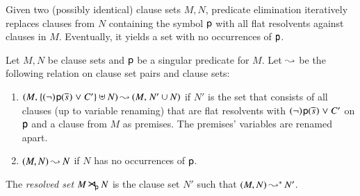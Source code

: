 
Given two (possibly identical) clause sets $M, N$, predicate elimination
iteratively replaces clauses from $N$ containing the symbol $\mathsf{p}$ with all flat
resolvents against clauses in $M$. Eventually, it yields a
set with no occurrences of $\mathsf{p}$.


\begin{defi}
\label{def:flat-res-set}
   Let $M, N$ be clause sets and $\mathsf{p}$ be a singular predicate for
   $M$. Let $\mathbin\leadsto$ be the following relation on clause set pairs and clause sets:
   \begin{enumerate}
   \item $(M{,}\> \{(\neg)\kern.2ex{\mathsf{p}(\overline{s}_{})} \mathrel{\lor} C'\} \uplus N) \mathbin\leadsto (M{,}\; N' \cup N)$ if
   $N'$ is the set that consists of all clauses (up to variable renaming) that are flat resolvents
   with $(\neg)\kern.2ex{\mathsf{p}(\overline{s}_{})} \mathrel{\lor} C'$ on $\mathsf{p}$ and a clause from $M$ as premises.
   The premises' variables are renamed apart.

   \smallskip
   \item $(M, N) \mathbin\leadsto N$ if $N$ has no occurrences of $\mathsf{p}$.
   \end{enumerate}
   \noindent  The \emph{resolved set} $M \mathbin{\smash{\hbox{\Large$\kern-.1ex\rtimes$}}}_{\!\mathsf{p}} N$ is the clause set $N'$ such that $(M,N) \mathbin\leadsto^* N'$.
\end{defi}

\pagebreak[2]

